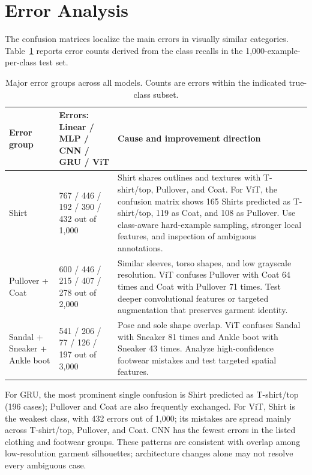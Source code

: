 \section{Error Analysis}

The confusion matrices localize the main errors in visually similar categories. Table~\ref{tab:error-analysis} reports error counts derived from the class recalls in the 1,000-example-per-class test set.

\begin{table}[H]
    \centering
    \scriptsize
    \caption{Major error groups across all models. Counts are errors within the indicated true-class subset.}
    \label{tab:error-analysis}
    \begin{tabularx}{\textwidth}{@{}p{2.6cm}p{3.5cm}X@{}}
        \toprule
        Error group & Errors: Linear / MLP / CNN / GRU / ViT & Cause and improvement direction \\
        \midrule
        Shirt & 767 / 446 / 192 / 390 / 432 out of 1,000 & Shirt shares outlines and textures with T-shirt/top, Pullover, and Coat. For ViT, the confusion matrix shows 165 Shirts predicted as T-shirt/top, 119 as Coat, and 108 as Pullover. Use class-aware hard-example sampling, stronger local features, and inspection of ambiguous annotations. \\
        Pullover + Coat & 600 / 446 / 215 / 407 / 278 out of 2,000 & Similar sleeves, torso shapes, and low grayscale resolution. ViT confuses Pullover with Coat 64 times and Coat with Pullover 71 times. Test deeper convolutional features or targeted augmentation that preserves garment identity. \\
        Sandal + Sneaker + Ankle boot & 541 / 206 / 77 / 126 / 197 out of 3,000 & Pose and sole shape overlap. ViT confuses Sandal with Sneaker 81 times and Ankle boot with Sneaker 43 times. Analyze high-confidence footwear mistakes and test targeted spatial features. \\
        \bottomrule
    \end{tabularx}
\end{table}

For GRU, the most prominent single confusion is Shirt predicted as T-shirt/top (196 cases); Pullover and Coat are also frequently exchanged. For ViT, Shirt is the weakest class, with 432 errors out of 1,000; its mistakes are spread mainly across T-shirt/top, Pullover, and Coat. CNN has the fewest errors in the listed clothing and footwear groups. These patterns are consistent with overlap among low-resolution garment silhouettes; architecture changes alone may not resolve every ambiguous case.
